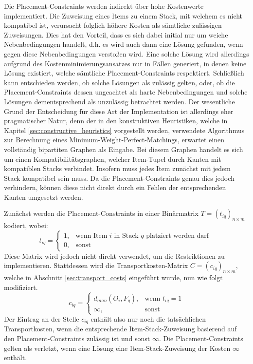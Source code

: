 Die Placement-Constraints werden indirekt über hohe Kostenwerte implementiert. Die Zuweisung eines Items zu einem
Stack, mit welchem es nicht kompatibel ist, verursacht folglich höhere Kosten als sämtliche zulässigen Zuweisungen.
Dies hat den Vorteil, dass es sich dabei initial nur um weiche Nebenbedingungen handelt,
d.h. es wird auch dann eine Lösung gefunden, wenn gegen diese Nebenbedingungen verstoßen wird.
Eine solche Lösung wird allerdings aufgrund des Kostenminimierungsansatzes nur in Fällen generiert,
in denen keine Lösung existiert, welche sämtliche Placement-Constraints respektiert.
Schließlich kann entschieden werden, ob solche Lösungen als zulässig gelten,
oder, ob die Placement-Constraints dessen ungeachtet als harte Nebenbedingungen und solche
Lösungen dementsprechend als unzulässig betrachtet werden.
Der wesentliche Grund der Entscheidung für diese Art der Implementation ist allerdings eher pragmatischer Natur, denn der in den konstruktiven Heuristiken, welche in Kapitel \ref{sec:constructive_heuristics} vorgestellt werden, verwendete Algorithmus zur Berechnung eines Minimum-Weight-Perfect-Matchings, erwartet einen vollständig bipartiten Graphen als Eingabe. Bei diesem Graphen handelt es sich um einen Kompatibilitätsgraphen, welcher Item-Tupel durch Kanten mit kompatiblen Stacks verbindet. Insofern muss jedes Item zunächst mit jedem Stack kompatibel sein muss. Da die Placement-Constraints genau dies jedoch verhindern, können diese nicht direkt durch ein Fehlen der entsprechenden Kanten umgesetzt werden.

Zunächst werden die Placement-Constraints in einer Binärmatrix $T = (t_{iq})_{n \times m}$ kodiert, wobei:
\[
    t_{iq} =
\begin{cases}
    1, & \text{wenn Item $i$ in Stack $q$ platziert werden darf }\\
    0, & \text{sonst}
\end{cases}
\]
Diese Matrix wird jedoch nicht direkt verwendet, um die Restriktionen zu implementieren. Stattdessen wird
die Transportkosten-Matrix $C = (c_{iq})_{n \times m}$, welche in Abschnitt \ref{sec:transport_costs} eingeführt wurde, nun wie folgt modifiziert.
\[
    c_{iq} =
\begin{cases}
    d_{man}(O_i, F_q), & \text{wenn $t_{iq} = 1$}\\
    \infty, & \text{sonst}
\end{cases}
\]
Der Eintrag an der Stelle $c_{iq}$ enthält also nur noch die tatsächlichen Transportkosten, wenn die
entsprechende Item-Stack-Zuweisung basierend auf den Placement-Constraints zulässig ist und sonst $\infty$.
Die Placement-Constraints gelten als verletzt, wenn eine Lösung eine Item-Stack-Zuweisung
der Kosten $\infty$ enthält.

